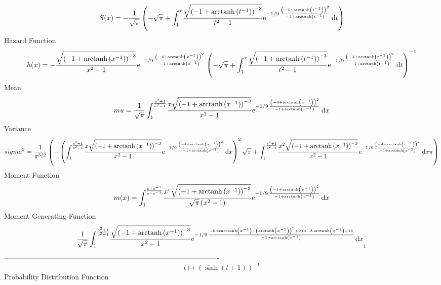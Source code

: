 \documentclass[12pt]{article}
\begin{document}
 $$ S(x)=-{\frac {1}{\sqrt {\pi}} \left( -\sqrt {\pi}+\int_{1}^{x}\!{\frac {
\sqrt { \left( -1+{\rm arctanh} \left({t}^{-1}\right) \right) ^{-3}}}{
{t}^{2}-1}{{\rm e}^{-1/9\,{\frac { \left( -4+{\rm arctanh} \left({t}^{
-1}\right) \right) ^{2}}{-1+{\rm arctanh} \left({t}^{-1}\right)}}}}}
\,{\rm d}t \right) }
$$ Hazard Function 
 $$ h(x)=-{\frac {\sqrt { \left( -1+{\rm arctanh} \left({x}^{-1}\right)
 \right) ^{-3}}}{{x}^{2}-1}{{\rm e}^{-1/9\,{\frac { \left( -4+
{\rm arctanh} \left({x}^{-1}\right) \right) ^{2}}{-1+{\rm arctanh} 
\left({x}^{-1}\right)}}}} \left( -\sqrt {\pi}+\int_{1}^{x}\!{\frac {
\sqrt { \left( -1+{\rm arctanh} \left({t}^{-1}\right) \right) ^{-3}}}{
{t}^{2}-1}{{\rm e}^{-1/9\,{\frac { \left( -4+{\rm arctanh} \left({t}^{
-1}\right) \right) ^{2}}{-1+{\rm arctanh} \left({t}^{-1}\right)}}}}}
\,{\rm d}t \right) ^{-1}}
$$Mean 
 $$ mu={\frac {1}{\sqrt {\pi}}\int_{1}^{{\frac {{{\rm e}^{2}}+1}{{{\rm e}^{2}
}-1}}}\!{\frac {x\sqrt { \left( -1+{\rm arctanh} \left({x}^{-1}\right)
 \right) ^{-3}}}{{x}^{2}-1}{{\rm e}^{-1/9\,{\frac { \left( -4+
{\rm arctanh} \left({x}^{-1}\right) \right) ^{2}}{-1+{\rm arctanh} 
\left({x}^{-1}\right)}}}}}\,{\rm d}x}
$$ Variance 
 $$ sigma^2 = {\frac {1}{{\pi}^{3/2}} \left( - \left( \int_{1}^{{\frac {{{\rm e}^{2}
}+1}{{{\rm e}^{2}}-1}}}\!{\frac {x\sqrt { \left( -1+{\rm arctanh} 
\left({x}^{-1}\right) \right) ^{-3}}}{{x}^{2}-1}{{\rm e}^{-1/9\,{
\frac { \left( -4+{\rm arctanh} \left({x}^{-1}\right) \right) ^{2}}{-1
+{\rm arctanh} \left({x}^{-1}\right)}}}}}\,{\rm d}x \right) ^{2}\sqrt 
{\pi}+\int_{1}^{{\frac {{{\rm e}^{2}}+1}{{{\rm e}^{2}}-1}}}\!{\frac {{
x}^{2}\sqrt { \left( -1+{\rm arctanh} \left({x}^{-1}\right) \right) ^{
-3}}}{{x}^{2}-1}{{\rm e}^{-1/9\,{\frac { \left( -4+{\rm arctanh} 
\left({x}^{-1}\right) \right) ^{2}}{-1+{\rm arctanh} \left({x}^{-1}
\right)}}}}}\,{\rm d}x\pi \right) }
$$Moment Function 
 $$ m(x) = \int_{1}^{{\frac {{\rm e}+{{\rm e}^{-1}}}{{\rm e}-{{\rm e}^{-1}}}}}\!{
\frac {{x}^{r}\sqrt { \left( -1+{\rm arctanh} \left({x}^{-1}\right)
 \right) ^{-3}}}{\sqrt {\pi} \left( {x}^{2}-1 \right) }{{\rm e}^{-1/9
\,{\frac { \left( -4+{\rm arctanh} \left({x}^{-1}\right) \right) ^{2}
}{-1+{\rm arctanh} \left({x}^{-1}\right)}}}}}\,{\rm d}x
$$ Moment Generating Function 
 $${\frac {1}{\sqrt {\pi}}\int_{1}^{{\frac {{{\rm e}^{2}}+1}{{{\rm e}^{2}
}-1}}}\!{\frac {\sqrt { \left( -1+{\rm arctanh} \left({x}^{-1}\right)
 \right) ^{-3}}}{{x}^{2}-1}{{\rm e}^{-1/9\,{\frac {-9\,tx{\rm arctanh}
 \left({x}^{-1}\right)+ \left( {\rm arctanh} \left({x}^{-1}\right)
 \right) ^{2}+9\,tx-8\,{\rm arctanh} \left({x}^{-1}\right)+16}{-1+
{\rm arctanh} \left({x}^{-1}\right)}}}}}\,{\rm d}x}_{{1}}
$$-------------------------------------------------------------------------------------------  \\$$t\mapsto  \left( \sinh \left( t+1 \right)  \right) ^{-1}
$$Probability Distribution Function 
\end{document}
